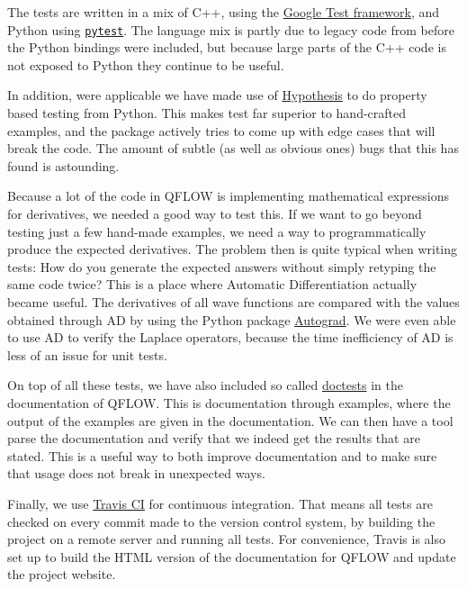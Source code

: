 \documentclass[Thesis.tex]{subfiles}
\begin{document}
The tests are written in a mix of C++, using the
\href{https://github.com/google/googletest}{Google Test framework}, and Python
using \href{https://docs.pytest.org/en/latest/}{\texttt{pytest}}. The language
mix is partly due to legacy code from before the Python bindings were included,
but because large parts of the C++ code is not exposed to Python they continue
to be useful.

In addition, were applicable we have made use of
\href{https://hypothesis.readthedocs.io/en/latest/index.html}{Hypothesis} to do
property based testing from Python. This makes test far superior to hand-crafted examples,
and the package actively tries to come up with edge cases that will break the
code. The amount of subtle (as well as obvious ones) bugs that this has found is
astounding.

Because a lot of the code in QFLOW is implementing mathematical expressions for
derivatives, we needed a good way to test this. If we want to go beyond testing
just a few hand-made examples, we need a way to programmatically produce the
expected derivatives. The problem then is quite typical when writing tests: How
do you generate the expected answers without simply retyping the same code
twice? This is a place where Automatic Differentiation actually became useful.
The derivatives of all wave functions are compared with the values obtained
through AD by using the Python package
\href{https://github.com/HIPS/autograd}{Autograd}. We were even able to use AD
to verify the Laplace operators, because the time inefficiency of AD is less of
an issue for unit tests.

On top of all these tests, we have also included so called
\href{https://docs.python.org/2/library/doctest.html}{doctests} in the
documentation of QFLOW. This is documentation through examples, where the output
of the examples are given in the documentation. We can then have a tool parse
the documentation and verify that we indeed get the results that are stated.
This is a useful way to both improve documentation and to make sure that usage
does not break in unexpected ways.

Finally, we use \href{https://travis-ci.org/}{Travis CI} for continuous
integration. That means all tests are checked on every commit made to the version control
system, by building the project on a remote server and running all tests. For
convenience, Travis is also set up to build the HTML version of the
documentation for QFLOW and update the project website.
\end{document}
